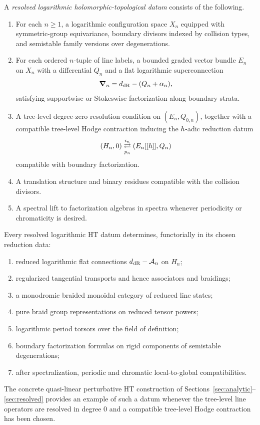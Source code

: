 \begin{definition}%
A \emph{resolved logarithmic holomorphic-topological datum} consists of the following.
\begin{enumerate}[label=\textup{(\roman*)}]
 \item For each $n\ge 1$, a logarithmic configuration space $X_n$ equipped with symmetric-group equivariance, boundary divisors indexed by collision types, and semistable family versions over degenerations.
 \item For each ordered $n$-tuple of line labels, a bounded graded vector bundle $E_n$ on $X_n$ with a differential $Q_n$ and a flat logarithmic superconnection
 \[
 \boldsymbol{\nabla}_n = d_{\mathrm{dR}}-(Q_n+\alpha_n),
 \]
 satisfying supportwise or Stokeswise factorization along boundary strata.
 \item A tree-level degree-zero resolution condition on $(E_n,Q_{0,n})$, together with a compatible tree-level Hodge contraction inducing the $\hbar$-adic reduction datum
 \[
 (H_n,0) \underset{p_n}{\stackrel{i_n}{\rightleftarrows}} (E_n[[\hbar]],Q_n)
 \]
 compatible with boundary factorization.
 \item A translation structure and binary residues compatible with the collision divisors.
 \item A spectral lift to factorization algebras in spectra whenever periodicity or chromaticity is desired.
\end{enumerate}
\end{definition}

\begin{theorem}%
Every resolved logarithmic HT datum determines, functorially in its chosen reduction data:
\begin{enumerate}[label=\textup{(\roman*)}]
 \item reduced logarithmic flat connections $d_{\mathrm{dR}}-\mathcal A_n$ on $H_n$;
 \item regularized tangential transports and hence associators and braidings;
 \item a monodromic braided monoidal category of reduced line states;
 \item pure braid group representations on reduced tensor powers;
 \item logarithmic period torsors over the field of definition;
 \item boundary factorization formulas on rigid components of semistable degenerations;
 \item after spectralization, periodic and chromatic local-to-global compatibilities.
\end{enumerate}
The concrete quasi-linear perturbative HT construction of Sections~\ref{sec:analytic}--\ref{sec:resolved} provides an example of such a datum whenever the tree-level line operators are resolved in degree $0$ and a compatible tree-level Hodge contraction has been chosen.
\end{theorem}

